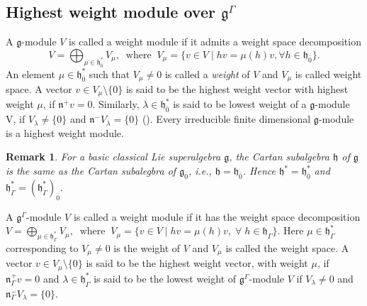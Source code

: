 \documentclass[11pt]{amsart}
\theoremstyle{plain}
\newtheorem{rem}[thm]{Remark}
\theoremstyle{definition}
\newcommand{\g}{\mathfrak{g}}
\newcommand{\h}{\mathfrak{h}}
\newcommand{\n}{\mathfrak{n}}
\begin{document}
\subsection{\textbf{Highest weight module over $\g^{\Gamma}$}}
 A $\g$-module $V$ is called a weight module if it admits a weight space decomposition 
\[V = \bigoplus_{\mu \in \h_{\bar 0}^{*}} V_{\mu}, \;\;\mbox{where}\;\; V_{\mu} = \{v \in V \mid hv = \mu(h)v, \forall h \in \h_{\bar 0}\}. \]
An element $\mu \in \h_{\bar 0}^{*}$ such that $V_{\mu} \neq 0$ is called a {\em weight} of $V$ and $V_{\mu}$ is called weight space. A vector $v\in V_{\mu}\setminus \{0\}$ is said to be the highest weight vector with highest weight $\mu$, if $\n^+v=0$. Similarly, $\lambda\in\h^*_{\bar{0}}$ is said to be lowest weight of a $\g$-module V, if $V_\lambda\neq\{0\}$ and $\n^-V_\lambda=\{0\}$ (\cite{BCM19}). Every irreducible finite dimensional $\g$-module is a highest weight module.
\begin{rem}
For a basic classical Lie superalgebra $\g$, the Cartan subalgebra $\h$ of $\g$ is the same as the Cartan subalegbra of $\g_{\bar{0}}$, i.e., $\h=\h_{\bar{0}}$. Hence $\h^*=\h^*_{\bar{0}}$ and $\h^*_{\Gamma}=(\h^*_{\Gamma})_{\bar{0}}.$
\end{rem} 
A $\g^{\Gamma}$-module $V$ is called a weight module if it has the weight space decomposition
$V = \bigoplus_{\mu \in \h^*_{\Gamma}} V_{\mu}, \;\;\mbox{where}\;\; V_{\mu} = \{v \in V \mid hv = \mu(h)v, \; \forall\; h \in \h_{\Gamma}\}$.
Here $\mu\in\h^*_{\Gamma}$ corresponding to $V_{\mu}\neq0$ is the weight of $V$ and $V_{\mu}$ is called the weight space. A vector $v\in V_{\mu}\setminus \{0\}$ is said to be the highest weight vector, with weight $\mu$, if $\n^+_{\Gamma}v=0$ and $\lambda\in\h^{*}_{\Gamma}$ is said to be the lowest weight of $\g^{\Gamma}$-module $V$ if $V_{\lambda}\neq0$ and $\n^-_{\Gamma}V_{\lambda}=\{0\}$.
\end{document}
